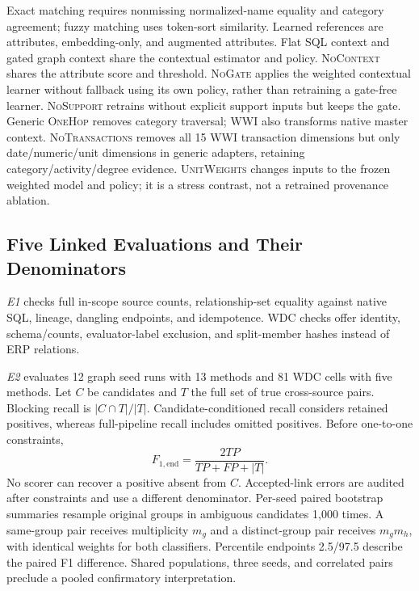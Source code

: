 \documentclass[conference,letterpaper]{IEEEtran}
\newcommand{\method}[1]{\textsc{#1}}
\begin{document}
Exact matching requires nonmissing normalized-name equality and category agreement; fuzzy matching uses token-sort similarity. Learned references are attributes, embedding-only, and augmented attributes. Flat SQL context and gated graph context share the contextual estimator and policy. \method{NoContext} shares the attribute score and threshold. \method{NoGate} applies the weighted contextual learner without fallback using its own policy, rather than retraining a gate-free learner. \method{NoSupport} retrains without explicit support inputs but keeps the gate. Generic \method{OneHop} removes category traversal; WWI also transforms native master context. \method{NoTransactions} removes all 15 WWI transaction dimensions but only date/numeric/unit dimensions in generic adapters, retaining category/activity/degree evidence. \method{UnitWeights} changes inputs to the frozen weighted model and policy; it is a stress contrast, not a retrained provenance ablation.

\subsection{Five Linked Evaluations and Their Denominators}
\emph{E1} checks full in-scope source counts, relationship-set equality against native SQL, lineage, dangling endpoints, and idempotence. WDC checks offer identity, schema/counts, evaluator-label exclusion, and split-member hashes instead of ERP relations.

\emph{E2} evaluates 12 graph seed runs with 13 methods and 81 WDC cells with five methods. Let $C$ be candidates and $T$ the full set of true cross-source pairs. Blocking recall is $|C\cap T|/|T|$. Candidate-conditioned recall considers retained positives, whereas full-pipeline recall includes omitted positives. Before one-to-one constraints,
\begin{equation}
F_{1,\mathrm{end}}=\frac{2TP}{TP+FP+|T|}.
\label{eq:endf1}
\end{equation}
No scorer can recover a positive absent from $C$. Accepted-link errors are audited after constraints and use a different denominator. Per-seed paired bootstrap summaries resample original groups in ambiguous candidates 1,000 times. A same-group pair receives multiplicity $m_g$ and a distinct-group pair receives $m_gm_h$, with identical weights for both classifiers. Percentile endpoints 2.5/97.5 describe the paired F1 difference. Shared populations, three seeds, and correlated pairs preclude a pooled confirmatory interpretation.
\end{document}
